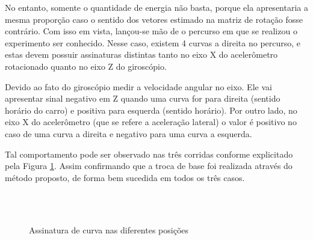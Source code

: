 No entanto, somente o quantidade de energia não basta, porque ela apresentaria a mesma proporção caso o sentido dos vetores estimado na matriz de rotação fosse contrário. Com isso em vista, lançou-se mão de o percurso em que se realizou o experimento ser conhecido. Nesse caso, existem 4 curvas a direita no percurso, e estas devem possuir assinaturas distintas tanto no eixo X do acelerômetro rotacionado quanto no eixo Z do giroscópio. 

Devido ao fato do giroscópio medir a velocidade angular no eixo. Ele vai apresentar sinal negativo em Z quando uma curva for para direita (sentido horário do carro) e positiva para esquerda (sentido horário). Por outro lado, no eixo X do acelerômetro (que se refere a aceleração lateral) o valor é positivo no caso de uma curva a direita e negativo para uma curva a esquerda.

Tal comportamento pode ser observado nas três corridas conforme explicitado pela Figura \ref{fig:assinaturaCurvas}. Assim confirmando que a troca de base foi realizada através do método proposto, de forma bem sucedida em todos os três casos.

\begin{figure}
    \centering
    \\
    \\
    \caption{Assinatura de curva nas diferentes posições}
    \label{fig:assinaturaCurvas}
\end{figure}{}

